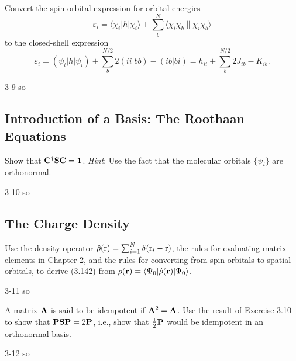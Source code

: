 \documentclass[a4paper]{book}
\newcommand\lr[2]{\langle#1\|#2\rangle}
\newcommand{\A}{{\bf A}}
\newcommand{\C}{{\bf C}}
\newcommand{\I}{{\bf 1}}
\newcommand{\PP}{{\bf P}}
\newcommand{\SSS}{{\bf S}}
\begin{document}
	\begin{exercise}
	Convert the spin orbital expression for orbital energies
	\[
		\varepsilon_i = \langle \chi_i | h | \chi_i \rangle + \sum_{b}^N \lr{\chi_i \chi_b}{\chi_i \chi_b}
	\]
	to the closed-shell expression
	\[
		\varepsilon_i = ( \psi_i | h | \psi_i ) + \sum_{b}^{N/2} 2(ii|bb) - (ib|bi) = h_{ii} + \sum_b^{N/2} 2J_{ib} - K_{ib}.
	\]
	\end{exercise}
	
	\begin{solution}
		3-9 so
	\end{solution}
	
	\subsection{Introduction of a Basis: The Roothaan Equations}
	
	\begin{exercise}
	Show that $\C^\dagger \SSS \C = \I$. {\it Hint}: Use the fact that the molecular orbitals $\{ \psi_i \}$ are orthonormal.
	\end{exercise}
	
	\begin{solution}
		3-10 so
	\end{solution}
	
	\subsection{The Charge Density}
	
	\begin{exercise}
	Use the density operator $\hat{\rho}({\rm r}) = \sum_{i=1}^N \delta( {\rm r}_i - {\rm r} )$, the rules for evaluating matrix elements in Chapter 2, and the rules for converting from spin orbitals to spatial orbitals, to derive (3.142) from $\rho({\bf r}) = \langle \Psi_0 | \hat{\rho}({\bf r}) | \Psi_0 \rangle$.
	\end{exercise}
	
	\begin{solution}
		3-11 so
	\end{solution}
	
	\begin{exercise}
	A matrix $\A$ is said to be idempotent if $\A^2 = \A$. Use the result of Exercise 3.10 to show that $\PP \SSS \PP = 2\PP$, i.e., show that $\frac{1}{2}\PP$ would be idempotent in an orthonormal basis.
	\end{exercise}
	
	\begin{solution}
		3-12 so
	\end{solution}
	
\end{document}
